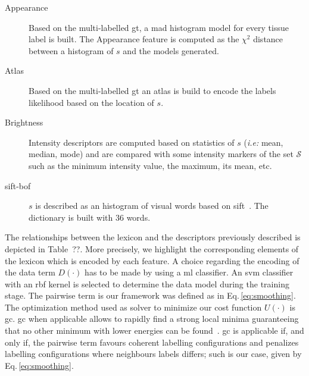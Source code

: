 \begin{description}
  \item[Appearance] 
    Based on the multi-labelled \ac{gt}, a \ac{mad} histogram model for every tissue label is built. The Appearance feature is computed as the $\chi^2$ distance between a histogram of $s$ and the models generated.
  \item[Atlas] 
    Based on the multi-labelled \ac{gt} an atlas is build to encode the labels likelihood based on the location of $s$.
  \item[Brightness] 
    Intensity descriptors are computed based on statistics of $s$ (\emph{i.e:} mean, median, mode) and  are compared with some intensity markers of the set $\mathcal{S}$ such as the minimum intensity value, the maximum, its mean, etc.
  \item[\ac{sift}-\ac{bof}]
    $s$ is described as an histogram of visual words based on \ac{sift}~\cite{massich2014sift}. The dictionary is built with $36$ words.
\end{description}

The relationships between the lexicon and the descriptors previously described is depicted in Table~{\color{red}??}. More precisely, we highlight the corresponding elements of the lexicon which is encoded by each feature. A choice regarding the encoding of the data term $D(\cdot)$ has to be made by using a \ac{ml} classifier. An \ac{svm} classifier with an \ac{rbf} kernel is selected to determine the data model during the training stage. The pairwise term is our framework was defined as in Eq.\,\eqref{eq:smoothing}. The optimization method used as solver to minimize our cost function $U(\cdot)$ is \ac{gc}. \ac{gc} when applicable allows to rapidly find a strong local minima guaranteeing that no other minimum with lower energies can be found~\cite{delong2012fast}. \ac{gc} is applicable if, and only if, the pairwise term favours coherent labelling configurations and penalizes labelling configurations where neighbours labels differs; such is our case, given by Eq.\,\eqref{eq:smoothing}.

